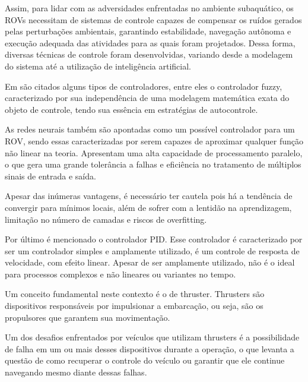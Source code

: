 \documentclass[../main.tex]{subfiles}
\begin{document}
Assim, para lidar com as adversidades enfrentadas no ambiente subaquático, os ROVs necessitam de sistemas de controle capazes de compensar os ruídos gerados pelas perturbações ambientais, garantindo estabilidade, navegação autônoma e execução adequada das atividades para as quais foram projetados. Dessa forma, diversas técnicas de controle foram desenvolvidas, variando desde a modelagem do sistema até a utilização de inteligência artificial. 

Em \cite{8559384} são citados alguns tipos de controladores, entre eles o controlador fuzzy, caracterizado por sua independência de uma modelagem matemática exata do objeto de controle, tendo sua essência em estratégias de autocontrole. 

As redes neurais também são apontadas como um possível controlador para um ROV, sendo essas caracterizadas por serem capazes de aproximar qualquer função não linear na teoria. Apresentam uma alta capacidade de processamento paralelo, o que gera uma grande tolerância a falhas e eficiência no tratamento de múltiplos sinais de entrada e saída. 

Apesar das inúmeras vantagens, é necessário ter cautela pois há a tendência de convergir para mínimos locais, além de sofrer com a lentidão na aprendizagem, limitação no número de camadas e riscos de overfitting. 

Por último é mencionado o controlador PID. Esse controlador é caracterizado por ser um controlador simples e amplamente utilizado, é um controle de resposta de velocidade, com efeito linear. Apesar de ser amplamente utilizado, não é o ideal para processos complexos e não lineares ou variantes no tempo.


Um conceito fundamental neste contexto é o de thruster. Thrusters são dispositivos responsáveis por impulsionar a embarcação, ou seja, são os propulsores que garantem sua movimentação. 

Um dos desafios enfrentados por veículos que utilizam thrusters é a possibilidade de falha em um ou mais desses dispositivos durante a operação, o que levanta a questão de como recuperar o controle do veículo ou garantir que ele continue navegando mesmo diante dessas falhas.
\end{document}
